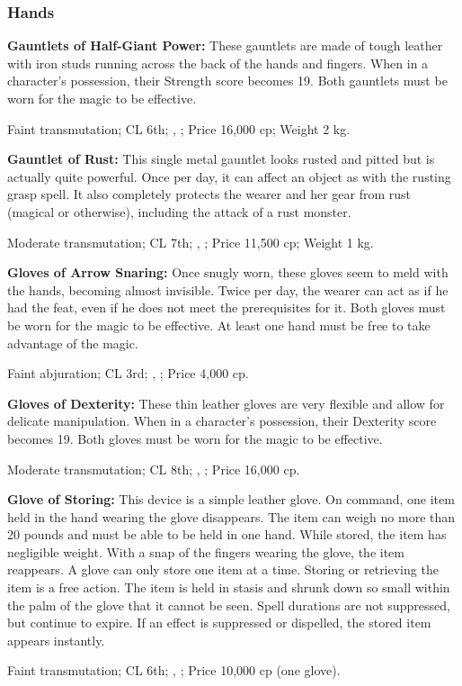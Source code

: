 \subsubsection{Hands}

\textbf{Gauntlets of Half-Giant Power:} These gauntlets are made of tough leather with iron studs running across the back of the hands and fingers. When in a character's possession, their Strength score becomes 19. Both gauntlets must be worn for the magic to be effective.

Faint transmutation; CL 6th; , ; Price 16,000 cp; Weight 2 kg.

\textbf{Gauntlet of Rust:} This single metal gauntlet looks rusted and pitted but is actually quite powerful. Once per day, it can affect an object as with the rusting grasp spell. It also completely protects the wearer and her gear from rust (magical or otherwise), including the attack of a rust monster.

Moderate transmutation; CL 7th; , ; Price 11,500 cp; Weight 1 kg.

\textbf{Gloves of Arrow Snaring:} Once snugly worn, these gloves seem to meld with the hands, becoming almost invisible. Twice per day, the wearer can act as if he had the  feat, even if he does not meet the prerequisites for it. Both gloves must be worn for the magic to be effective. At least one hand must be free to take advantage of the magic.

Faint abjuration; CL 3rd; , ; Price 4,000 cp.

\textbf{Gloves of Dexterity:} These thin leather gloves are very flexible and allow for delicate manipulation. When in a character's possession, their Dexterity score becomes 19. Both gloves must be worn for the magic to be effective.

Moderate transmutation; CL 8th; , ; Price 16,000 cp.

\textbf{Glove of Storing:} This device is a simple leather glove. On command, one item held in the hand wearing the glove disappears. The item can weigh no more than 20 pounds and must be able to be held in one hand. While stored, the item has negligible weight. With a snap of the fingers wearing the glove, the item reappears. A glove can only store one item at a time. Storing or retrieving the item is a free action. The item is held in stasis and shrunk down so small within the palm of the glove that it cannot be seen. Spell durations are not suppressed, but continue to expire. If an effect is suppressed or dispelled, the stored item appears instantly.

Faint transmutation; CL 6th; , ; Price 10,000 cp (one glove).


